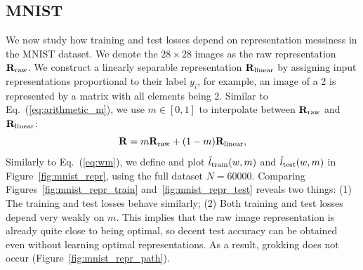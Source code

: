 \documentclass{article} %
\newcommand{\mat}[1]{\mathbf{#1}}
\begin{document}



\subsection{MNIST}\label{subsec:mnist_repr}


We now study how training and test losses depend on representation messiness in the MNIST dataset. We denote the $28\times 28$ images as the raw representation $\mat{R}_{\rm raw}$. We construct a linearly separable representation $\mat{R}_{\rm linear}$ by assigning input representations proportional to their label $y_i$, for example, an image of a 2 is represented by a matrix with all elements being 2. Similar to Eq.~(\ref{eq:arithmetic_m}), we use $m\in [0,1]$ to interpolate between $\mat{R}_{\rm raw}$ and $\mat{R}_{\rm linear}$:
\begin{equation}
    \mat{R} = m\mat{R}_{\rm raw} + (1-m)\mat{R}_{\rm linear},
\end{equation}
Similarly to Eq.~(\ref{eq:wm}), we define and plot $\tilde{l}_{\rm train}(w, m)$ and $\tilde{l}_{\rm test}(w, m)$ in Figure~\ref{fig:mnist_repr}, using the full dataset $N=60000$. Comparing Figures~\ref{fig:mnist_repr_train} and~\ref{fig:mnist_repr_test} reveals two things: (1) The training and test losses behave similarly; (2) Both training and test losses depend very weakly on $m$. This implies that the raw image representation is already quite close to being optimal, so decent test accuracy can be obtained even without learning optimal representations. As a result, grokking does not occur (Figure~\ref{fig:mnist_repr_path}). 
\end{document}
